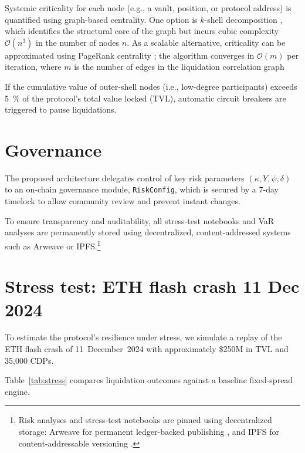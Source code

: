 \documentclass[11pt]{article}
\begin{document}
Systemic criticality for each node (e.g., a vault, position, or protocol address) is quantified using graph-based centrality.  
One option is $k$-shell decomposition \parencite{battiston2012debtrank}, which identifies the structural core of the graph but incurs cubic complexity $\mathcal{O}(n^3)$ in the number of nodes $n$.  
As a scalable alternative, criticality can be approximated using PageRank centrality \parencite{page1999pagerank}; the algorithm converges in $\mathcal{O}(m)$ per iteration, where $m$ is the number of edges in the liquidation correlation graph

If the cumulative value of outer-shell nodes (i.e., low-degree participants) exceeds \SI{5}{\percent} of the protocol’s total value locked (TVL), automatic circuit breakers are triggered to pause liquidations.

\section{Governance}
\label{sec:governance}
The proposed architecture delegates control of key risk parameters \((\kappa, Y, \psi, \delta)\) to an on-chain governance module, \texttt{RiskConfig}, which is secured by a 7-day timelock to allow community review and prevent instant changes.

To ensure transparency and auditability, all stress-test notebooks and VaR analyses are permanently stored using decentralized, content-addressed systems such as Arweave or IPFS.\footnote{Risk analyses and stress-test notebooks are pinned using decentralized storage: Arweave for permanent ledger-backed publishing \parencite{williams2023arweave}, and IPFS for content-addressable versioning \parencite{benet2014ipfs}.}


\section{Stress test: ETH flash crash 11 Dec 2024}

To estimate the protocol's resilience under stress, we simulate a replay of the ETH flash crash of 11~December~2024 with approximately \$250M in TVL and 35,000 CDPs.
  
Table~\ref{tab:stress} compares liquidation outcomes against a baseline fixed-spread engine.
\end{document}
